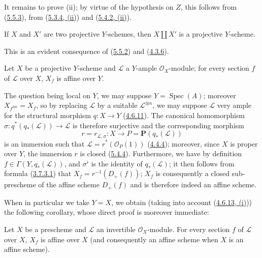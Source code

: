 It remains to prove (ii); by virtue of the hypothesis on $Z$, this follows
from (\hyperref[II.5.5.3]{5.5.3}), from
(\hyperref[II.5.3.4]{5.3.4, (ii)}) and
(\hyperref[II.5.4.2]{5.4.2, (ii)}).

\begin{proposition}[5.5.6]
\label{II.5.5.6}
If $X$ and $X'$ are two projective $Y$-schemes, then $X\amalg X'$ is a
projective $Y$-scheme.
\end{proposition}

This is an evident consequence of (\hyperref[II.5.5.2]{5.5.2}) and
(\hyperref[II.4.3.6]{4.3.6}).

\begin{proposition}[5.5.7]
\label{II.5.5.7}
Let $X$ be a projective $Y$-scheme and $\mathcal{L}$ a $Y$-ample
$\mathcal{O}_X$-module; for every section $f$ of $\mathcal{L}$ over $X$,
$X_f$ is affine over $Y$.
\end{proposition}


The question being local on $Y$, we may suppose
$Y=\operatorname{Spec}(A)$; moreover
$X_{f^{\otimes n}}=X_f$, so by replacing $\mathcal{L}$ by a suitable
$\mathcal{L}^{\otimes n}$, we may suppose $\mathcal{L}$ very
ample for the structural morphism $q:X\to Y$
(\hyperref[II.4.6.11]{4.6.11}). The canonical homomorphism
$\sigma:q^*(q_*(\mathcal{L}))\to\mathcal{L}$ is therefore surjective and
the corresponding morphism
\[
r=r_{\mathcal{L},\sigma}:X\to P=\mathbf{P}(q_*(\mathcal{L}))
\]
is an immersion such that $\mathcal{L}=r^*(\mathcal{O}_P(1))$
(\hyperref[II.4.4.4]{4.4.4}); moreover, since $X$ is proper over $Y$,
the immersion $r$ is closed (\hyperref[II.5.4.4]{5.4.4}). Furthermore, we
have by definition $f\in\Gamma(Y,q_*(\mathcal{L}))$, and $\sigma^\flat$ is
the identity of $q_*(\mathcal{L})$; it then follows from formula
(\hyperref[II.3.7.3.1]{3.7.3.1}) that $X_f=r^{-1}(D_+(f))$; $X_f$
is consequently a closed sub-prescheme of the affine scheme $D_+(f)$ and is
therefore indeed an affine scheme.

When in particular we take $Y=X$, we obtain (taking into account
(\hyperref[II.4.6.13]{4.6.13, (i)})) the following corollary, whose
direct proof is moreover immediate:

\begin{corollary}[5.5.8]
\label{II.5.5.8}
Let $X$ be a prescheme and $\mathcal{L}$ an invertible $\mathcal{O}_X$-module.
For every section $f$ of $\mathcal{L}$ over $X$, $X_f$ is affine
over $X$ (and consequently an affine scheme when $X$ is an affine scheme).
\end{corollary}

